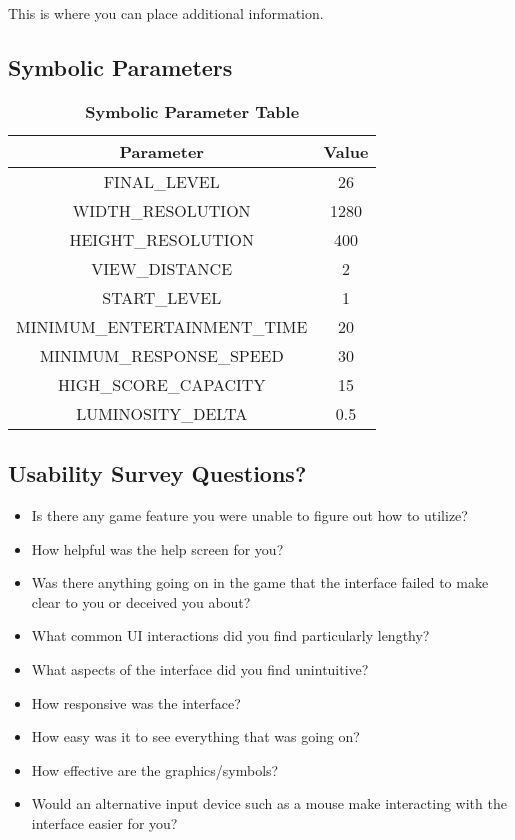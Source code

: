 \documentclass[12pt, titlepage]{article}
\begin{document}
This is where you can place additional information.

\subsection{Symbolic Parameters}

	\begin{table}[h!]
		\centering
		\caption{\textbf{Symbolic Parameter Table}}
		\label{symbolicParameters}
		\bigskip
		\def\arraystretch{1.6}


		\begin{tabular}{| c | c |}
			\bottomrule
			\textbf{Parameter} & \textbf{Value} \\
			\hline
			FINAL\_LEVEL & 26 \\
			WIDTH\_RESOLUTION & 1280 \\
			HEIGHT\_RESOLUTION & 400 \\
			VIEW\_DISTANCE & 2 \\
			START\_LEVEL & 1 \\
			MINIMUM\_ENTERTAINMENT\_TIME & 20 \\
			MINIMUM\_RESPONSE\_SPEED & 30 \\
			HIGH\_SCORE\_CAPACITY & 15 \\
			LUMINOSITY\_DELTA & 0.5 \\
			\toprule
		\end{tabular}
	\end{table}


\subsection{Usability Survey Questions?}

	\begin{itemize}
		\item Is there any game feature you were unable to figure out how to utilize?
		\item How helpful was the help screen for you?
		\item Was there anything going on in the game that the interface failed to make clear to you or deceived you about?
		\item What common UI interactions did you find particularly lengthy?
		\item What aspects of the interface did you find unintuitive?
		\item How responsive was the interface?
		\item How easy was it to see everything that was going on?
		\item How effective are the graphics/symbols?
		\item Would an alternative input device such as a mouse make interacting with the interface easier for you?
	\end{itemize}
\end{document}
